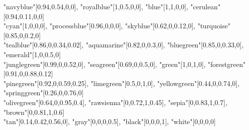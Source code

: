 \documentclass[a4j]{jarticle}
\begin{document}
\hspace*{2.5zw}"navyblue"[0.94,0.54,0,0],
"royalblue"[1,0.5,0,0],
"blue"[1,1,0,0],
"cerulean"[0.94,0.11,0,0]\\
\hspace*{2.5zw}"cyan"[1,0,0,0],
"processblue"[0.96,0,0,0],
"skyblue"[0.62,0,0.12,0],
"turquoise"[0.85,0,0.2,0]\\
\hspace*{2.5zw}"tealblue"[0.86,0,0.34,0.02],
"aquamarine"[0.82,0,0.3,0],
"bluegreen"[0.85,0,0.33,0],\\
\hspace*{2.5zw}"emerald"[1,0,0.5,0]\\
\hspace*{2.5zw}"junglegreen"[0.99,0,0.52,0],
"seagreen"[0.69,0,0.5,0],
"green"[1,0,1,0],
"forestgreen"[0.91,0,0.88,0.12]\\
\hspace*{2.5zw}"pinegreen"[0.92,0,0.59,0.25],
"limegreen"[0.5,0,1,0],
"yellowgreen"[0.44,0,0.74,0],\\
\hspace*{2.5zw}"springgreen"[0.26,0,0.76,0]\\
\hspace*{2.5zw}"olivegreen"[0.64,0,0.95,0.4],
"rawsienna"[0,0.72,1,0.45],
"sepia"[0,0.83,1,0.7],
"brown"[0,0.81,1,0.6]\\
\hspace*{2.5zw}"tan"[0.14,0.42,0.56,0],
"gray"[0,0,0,0.5],
"black"[0,0,0,1],
"white"[0,0,0,0]
\end{document}
